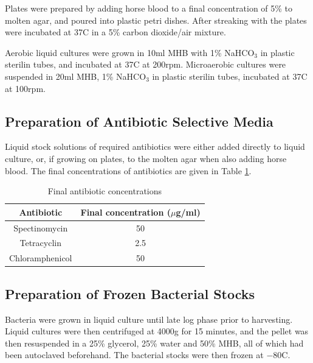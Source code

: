 Plates were prepared by adding horse blood to a final concentration of 5\% to molten agar, and poured into plastic petri dishes. After streaking with \Nm{} the plates were incubated at 37\textdegree C in a 5\% carbon dioxide/air mixture.

Aerobic liquid cultures were grown in 10ml MHB with 1\% NaHCO$_\textrm{3}$ in plastic sterilin tubes, and incubated at 37\textdegree C at 200rpm. Microaerobic cultures were suspended in 20ml MHB, 1\% NaHCO$_\textrm{3}$ in plastic sterilin tubes, incubated at 37\textdegree C at 100rpm.

\subsection{Preparation of Antibiotic Selective Media}
Liquid stock solutions of required antibiotics were either added directly to liquid culture, or, if growing on plates, to the molten agar when also adding horse blood. The final concentrations of antibiotics are given in Table \ref{tab:antibiotic-concs}.

\begin{table}[here]
\begin{center}
\begin{tabular}{cc}
\toprule
\textbf{Antibiotic} & \textbf{Final concentration ($\mu$g/ml)} \\
\midrule
Spectinomycin & 50 \\
Tetracyclin & 2.5 \\
Chloramphenicol & 50 \\
\bottomrule
\end{tabular} 
\end{center}
\caption{Final antibiotic concentrations
\label{tab:antibiotic-concs}}
\end{table}

\subsection{Preparation of Frozen Bacterial Stocks}
Bacteria were grown in liquid culture until late log phase prior to harvesting. Liquid cultures were then centrifuged at 4000g for 15 minutes, and the pellet was then resuspended in a 25\% glycerol, 25\% water and 50\% MHB, all of which had been autoclaved beforehand. The bacterial stocks were then frozen at $-80$\textdegree C.

